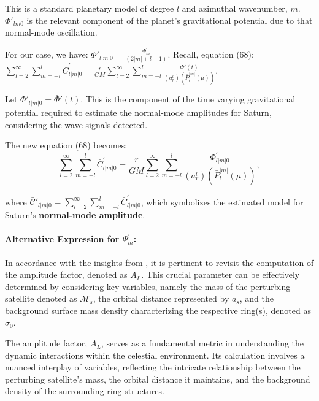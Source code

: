 \documentclass{article}
\begin{document}
This is a standard planetary model of degree $l$ and azimuthal wavenumber, $m$. $\Phi{'}_{lm0}$ is the relevant component of the planet’s gravitational potential due to that normal-mode oscillation. 

For our case, we have: $\Phi{'}_{l|m|0} = \frac{\Psi^{'}_{m}}{(2|m| + l + 1)}$. Recall, equation (68): $\sum_{l=2}^{\infty}\sum_{m=-l}^{l}\bar{C}_{l|m|0}^{'} =\frac{r}{GM} \sum_{l=2}^{\infty}\sum_{m=-l}^{l}\frac{\bar{\Phi}{'}(t)}{(a_{r}^{l})(\bar{P}_{l}^{|m|}(\mu))}$. 

Let $\Phi{'}_{l|m|0} = \bar{\Phi}{'}(t)$. This is the component of the time varying gravitational potential required to estimate the normal-mode amplitudes for Saturn, considering the wave signals detected. 

The new equation (68) becomes: 
\begin{equation}
    \sum_{l=2}^{\infty}\sum_{m=-l}^{l}\bar{C}_{l|m|0}^{'} =\frac{r}{GM} \sum_{l=2}^{\infty}\sum_{m=-l}^{l}\frac{{\Phi}^{'}_{l|m|0}}{(a_{r}^{l})(\bar{P}_{l}^{|m|}(\mu))},
\end{equation}

where $\mathscr{\bar{C}'}_{l|m|0} = \sum_{l=2}^{\infty}\sum_{m=-l}^{l}\bar{C}_{l|m|0}^{'}$, which symbolizes the estimated model for Saturn's \textbf{normal-mode amplitude}.

\paragraph{Alternative Expression for $\Psi^{'}_{m}$:}

In accordance with the insights from \cite{Nicholson1990AnAR}, it is pertinent to revisit the computation of the amplitude factor, denoted as $A_{L}$. This crucial parameter can be effectively determined by considering key variables, namely the mass of the perturbing satellite denoted as $\mathcal{M}_{s}$, the orbital distance represented by $a_{s}$, and the background surface mass density characterizing the respective ring(s), denoted as $\sigma_{0}$.

The amplitude factor, $A_{L}$, serves as a fundamental metric in understanding the dynamic interactions within the celestial environment. Its calculation involves a nuanced interplay of variables, reflecting the intricate relationship between the perturbing satellite's mass, the orbital distance it maintains, and the background density of the surrounding ring structures.
\end{document}
